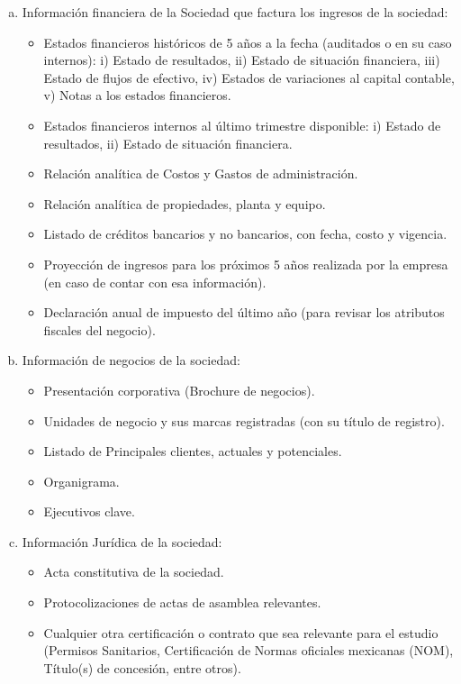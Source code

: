 \documentclass[5pt,letter]{article}
\begin{document}
 \begin{enumerate}[a)]
 \item Información financiera de la Sociedad que factura los ingresos de la sociedad:
 \begin{itemize}
\item Estados financieros históricos de 5 años a la fecha (auditados o en su caso internos): i) Estado de resultados, ii) Estado de situación financiera, iii) Estado de flujos de efectivo, iv) Estados de variaciones al capital contable, v) Notas a los estados financieros.
\item Estados financieros internos al último trimestre disponible: i) Estado de resultados, ii) Estado de situación financiera.
\item Relación analítica de Costos y Gastos de administración.
\item Relación analítica de propiedades, planta y equipo.
\item Listado de créditos bancarios y no bancarios, con fecha, costo y vigencia.
\item Proyección de ingresos para los próximos 5 años realizada por la empresa (en
caso de contar con esa información).
\item Declaración anual de impuesto del último año (para revisar los atributos fiscales
del negocio).
\end{itemize}
\item  Información de negocios de la sociedad:
\begin{itemize}
\item Presentación corporativa (Brochure de negocios).
\item Unidades de negocio y sus marcas registradas (con su título de registro).
\item Listado de Principales clientes, actuales y potenciales.
\item Organigrama.
\item Ejecutivos clave.
\end{itemize}
\item Información Jurídica de la sociedad:
\begin{itemize}
\item Acta constitutiva de la sociedad.
\item Protocolizaciones de actas de asamblea relevantes.
\item Cualquier otra certificación o contrato que sea relevante para el estudio (Permisos
Sanitarios, Certificación de Normas oficiales mexicanas (NOM), Título(s) de concesión, entre otros).
\end{itemize}
\end{enumerate}
\end{document}
